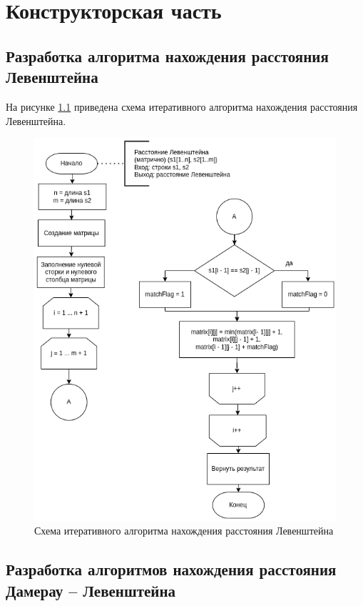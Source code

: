 \chapter{Конструкторская часть}

\section{Разработка алгоритма нахождения расстояния Левенштейна}

На рисунке \ref{img:lev} приведена схема итеративного алгоритма нахождения расстояния Левенштейна.
\begin{figure}[h]
	\centering
	\includegraphics[width=140mm]{lev}
	\caption{Схема итеративного алгоритма нахождения расстояния Левенштейна}
	\label{img:lev}
\end{figure}

\section{Разработка алгоритмов нахождения расстояния Дамерау -- Левенштейна}


